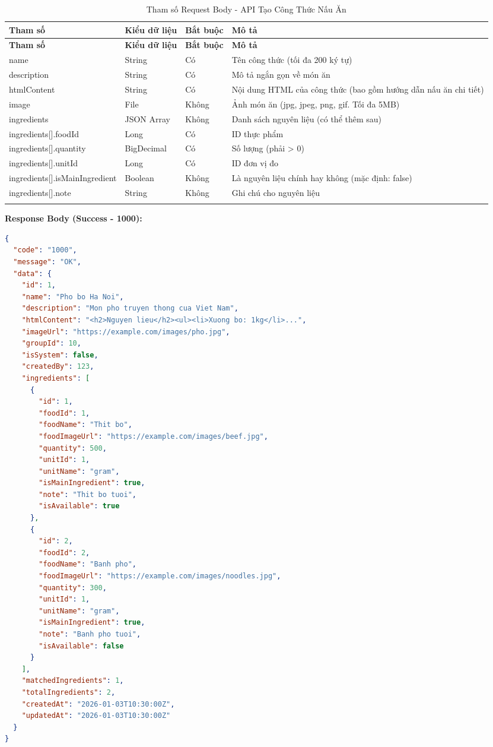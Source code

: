 \small
\begin{longtable}{|>{\raggedright\arraybackslash}p{3.5cm}|>{\raggedright\arraybackslash}p{2.5cm}|>{\raggedright\arraybackslash}p{2cm}|>{\raggedright\arraybackslash}p{5.5cm}|}
\hline
\textbf{Tham số} & \textbf{Kiểu dữ liệu} & \textbf{Bắt buộc} & \textbf{Mô tả} \\
\hline
\endfirsthead
\hline
\textbf{Tham số} & \textbf{Kiểu dữ liệu} & \textbf{Bắt buộc} & \textbf{Mô tả} \\
\hline
\endhead
name & String & Có & Tên công thức (tối đa 200 ký tự) \\
\hline
description & String & Có & Mô tả ngắn gọn về món ăn \\
\hline
htmlContent & String & Có & Nội dung HTML của công thức (bao gồm hướng dẫn nấu ăn chi tiết) \\
\hline
image & File & Không & Ảnh món ăn (jpg, jpeg, png, gif. Tối đa 5MB) \\
\hline
ingredients & JSON Array & Không & Danh sách nguyên liệu (có thể thêm sau) \\
\hline
ingredients[].foodId & Long & Có & ID thực phẩm \\
\hline
ingredients[].quantity & BigDecimal & Có & Số lượng (phải > 0) \\
\hline
ingredients[].unitId & Long & Có & ID đơn vị đo \\
\hline
ingredients[].isMainIngredient & Boolean & Không & Là nguyên liệu chính hay không (mặc định: false) \\
\hline
ingredients[].note & String & Không & Ghi chú cho nguyên liệu \\
\hline
\caption{Tham số Request Body - API Tạo Công Thức Nấu Ăn}
\end{longtable}

\textbf{Response Body (Success - 1000):}

\begin{lstlisting}[language=json, caption=Response thanh cong API 4.1]
{
  "code": "1000",
  "message": "OK",
  "data": {
    "id": 1,
    "name": "Pho bo Ha Noi",
    "description": "Mon pho truyen thong cua Viet Nam",
    "htmlContent": "<h2>Nguyen lieu</h2><ul><li>Xuong bo: 1kg</li>...",
    "imageUrl": "https://example.com/images/pho.jpg",
    "groupId": 10,
    "isSystem": false,
    "createdBy": 123,
    "ingredients": [
      {
        "id": 1,
        "foodId": 1,
        "foodName": "Thit bo",
        "foodImageUrl": "https://example.com/images/beef.jpg",
        "quantity": 500,
        "unitId": 1,
        "unitName": "gram",
        "isMainIngredient": true,
        "note": "Thit bo tuoi",
        "isAvailable": true
      },
      {
        "id": 2,
        "foodId": 2,
        "foodName": "Banh pho",
        "foodImageUrl": "https://example.com/images/noodles.jpg",
        "quantity": 300,
        "unitId": 1,
        "unitName": "gram",
        "isMainIngredient": true,
        "note": "Banh pho tuoi",
        "isAvailable": false
      }
    ],
    "matchedIngredients": 1,
    "totalIngredients": 2,
    "createdAt": "2026-01-03T10:30:00Z",
    "updatedAt": "2026-01-03T10:30:00Z"
  }
}
\end{lstlisting}

